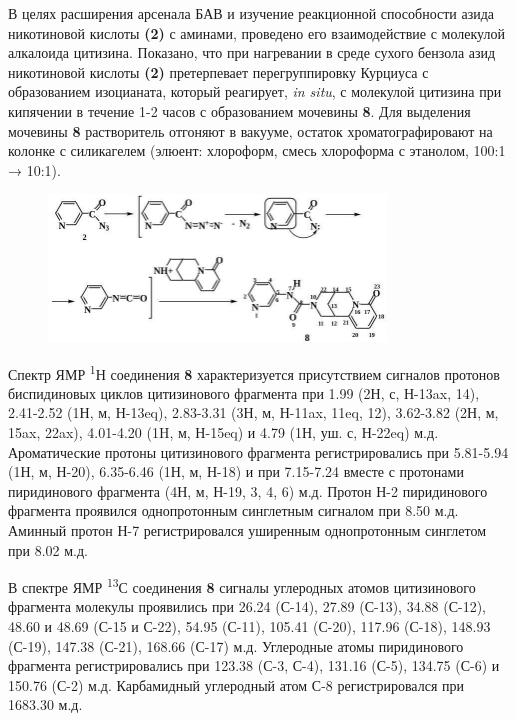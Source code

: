 В целях расширения арсенала БАВ и изучение реакционной способности азида
никотиновой кислоты {\bfseries (2)} с аминами, проведено его взаимодействие
с молекулой алкалоида цитизина. Показано, что при нагревании в среде
сухого бензола азид никотиновой кислоты {\bfseries (2)} претерпевает
перегруппировку Курциуса с образованием изоцианата, который реагирует,
\emph{in situ}, с молекулой цитизина при кипячении в течение 1-2 часов с
образованием мочевины {\bfseries 8}. Для выделения мочевины {\bfseries 8}
растворитель отгоняют в вакууме, остаток хроматографировают на колонке с
силикагелем (элюент: хлороформ, смесь хлороформа с этанолом, 100:1 →
10:1).

\begin{figure}[H]
	\centering
	\includegraphics[width=0.8\textwidth]{assets/10}
	\caption*{}
\end{figure}

Спектр ЯМР \textsuperscript{1}Н соединения {\bfseries 8} характеризуется
присутствием сигналов протонов биспидиновых циклов цитизинового
фрагмента при 1.99 (2Н, с, Н-13ax, 14), 2.41-2.52 (1Н, м, Н-13eq),
2.83-3.31 (3Н, м, Н-11ax, 11eq, 12), 3.62-3.82 (2Н, м, 15ax, 22ax),
4.01-4.20 (1H, м, Н-15eq) и 4.79 (1Н, уш. с, Н-22eq) м.д. Ароматические
протоны цитизинового фрагмента регистрировались при 5.81-5.94 (1Н, м,
Н-20), 6.35-6.46 (1Н, м, Н-18) и при 7.15-7.24 вместе с протонами
пиридинового фрагмента (4Н, м, Н-19, 3, 4, 6) м.д. Протон Н-2
пиридинового фрагмента проявился однопротонным синглетным сигналом при
8.50 м.д. Аминный протон Н-7 регистрировался уширенным однопротонным
синглетом при 8.02 м.д.

В спектре ЯМР \textsuperscript{13}С соединения {\bfseries 8} сигналы
углеродных атомов цитизинового фрагмента молекулы проявились при 26.24
(С-14), 27.89 (С-13), 34.88 (С-12), 48.60 и 48.69 (С-15 и С-22), 54.95
(С-11), 105.41 (С-20), 117.96 (С-18), 148.93 (С-19), 147.38 (С-21),
168.66 (С-17) м.д. Углеродные атомы пиридинового фрагмента
регистрировались при 123.38 (С-3, С-4), 131.16 (С-5), 134.75 (С-6) и
150.76 (С-2) м.д. Карбамидный углеродный атом С-8 регистрировался при
1683.30 м.д.


